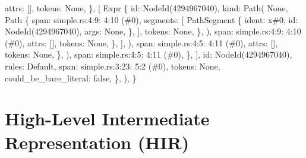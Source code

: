 \documentclass[
  11pt,
  twoside]{report}
\newenvironment{Shaded}{}{}
\newcommand{\NormalTok}[1]{#1}
\begin{document}
\begin{Shaded}
\begin{Highlighting}[]
\NormalTok{                                    attrs: [],}
\NormalTok{                                    tokens: None,}
\NormalTok{                                \},}
\NormalTok{                                [}
\NormalTok{                                    Expr \{}
\NormalTok{                                        id: NodeId(4294967040),}
\NormalTok{                                        kind: Path(}
\NormalTok{                                            None,}
\NormalTok{                                            Path \{}
\NormalTok{                                                span: simple.rs:4:9: 4:10 (\#0),}
\NormalTok{                                                segments: [}
\NormalTok{                                                    PathSegment \{}
\NormalTok{                                                        ident: x\#0,}
\NormalTok{                                                        id: NodeId(4294967040),}
\NormalTok{                                                        args: None,}
\NormalTok{                                                    \},}
\NormalTok{                                                ],}
\NormalTok{                                                tokens: None,}
\NormalTok{                                            \},}
\NormalTok{                                        ),}
\NormalTok{                                        span: simple.rs:4:9: 4:10 (\#0),}
\NormalTok{                                        attrs: [],}
\NormalTok{                                        tokens: None,}
\NormalTok{                                    \},}
\NormalTok{                                ],}
\NormalTok{                            ),}
\NormalTok{                            span: simple.rs:4:5: 4:11 (\#0),}
\NormalTok{                            attrs: [],}
\NormalTok{                            tokens: None,}
\NormalTok{                        \},}
\NormalTok{                    ),}
\NormalTok{                    span: simple.rs:4:5: 4:11 (\#0),}
\NormalTok{                \},}
\NormalTok{            ],}
\NormalTok{            id: NodeId(4294967040),}
\NormalTok{            rules: Default,}
\NormalTok{            span: simple.rs:3:23: 5:2 (\#0),}
\NormalTok{            tokens: None,}
\NormalTok{            could\_be\_bare\_literal: false,}
\NormalTok{        \},}
\NormalTok{    ),}
\NormalTok{\}}
\end{Highlighting}
\end{Shaded}

\section{High-Level Intermediate Representation
(HIR)}\label{sec:high-level-intermediate-representation-hir}
\end{document}
